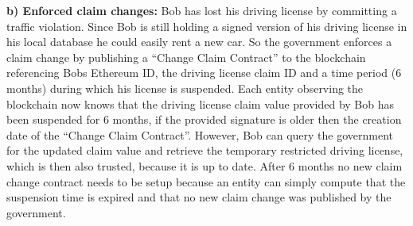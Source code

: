 \textbf{b) Enforced claim changes:}
Bob has lost his driving license by committing a traffic violation. Since Bob is still holding a signed version of his driving license in his local database he could easily rent a new car. So the government enforces a claim change by publishing a “Change Claim Contract” to the blockchain referencing Bobs Ethereum ID, the driving license claim ID and a time period (6 months) during which his license is suspended. Each entity observing the blockchain now knows that the driving license claim value provided by Bob has been suspended for 6 months, if the provided signature is older then the creation date of the “Change Claim Contract”. However, Bob can query the government for the updated claim value and retrieve the temporary restricted driving license, which is then also trusted, because it is up to date. After 6 months no new claim change contract needs to be setup because an entity can simply compute that the suspension time is expired and that no new claim change was published by the government.
